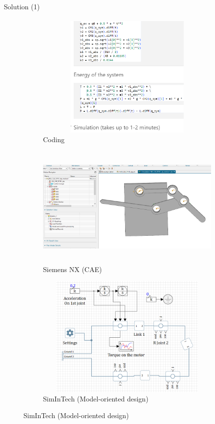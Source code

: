 \documentclass[aspectratio=169]{beamer}
\begin{document}
\begin{frame}[t]{Solution (1)}
\framesubtitle{}
    \vspace{-0.6cm}
    \begin{figure}[H]
        \begin{subfigure}[t]{0.32\textwidth}
            \centering\includegraphics[height=6cm,width=1\textwidth,keepaspectratio]{code.png}
            \caption*{Coding}
            \label{fig:code.png}
        \end{subfigure}
        \begin{subfigure}[t]{0.32\textwidth}
            \centering\includegraphics[height=6cm,width=1\textwidth,keepaspectratio]{nx.png}
            \caption*{Siemens NX (CAE)}
            \label{fig:nx.png}
        \end{subfigure}
        \begin{subfigure}[t]{0.32\textwidth}
            \centering\includegraphics[height=6cm,width=1\textwidth,keepaspectratio]{simintech.png}
            \caption*{SimInTech (Model-oriented design)}
            \label{fig:simintech.png}
        \end{subfigure}
    \end{figure}
\end{frame}  
\end{document}
